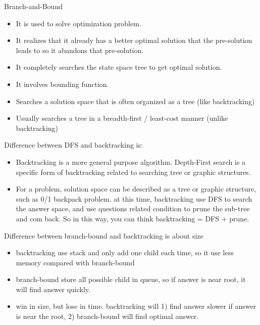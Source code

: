 \documentclass[a4paper,11pt,twoside]{book}
\begin{document}
	\par Branch-and-Bound
\begin{itemize}
\item It is used to solve optimization problem.

\item It realizes that it already has a better optimal solution that the pre-solution leads to so it abandons that pre-solution.

\item It completely searches the state space tree to get optimal solution.

\item It involves bounding function.

\item Searches a solution space that is often organized as a tree (like backtracking)

\item Usually searches a tree in a breadth-first / least-cost manner (unlike backtracking)

\end{itemize}

	\par Difference between DFS and backtracking is:
\begin{itemize}
\item Backtracking is a more general purpose algorithm. Depth-First search is a specific form of backtracking related to searching tree or graphic structures. 
 
\item For a problem, solution space can be described as a tree or graphic structure, such as 0/1 backpack problem. at this time, backtracking use DFS to search the answer space, and use questions related condition to prune the sub-tree and com back. So in this way, you can think backtracking = DFS + prune. 
\end{itemize}

\par Difference between branch-bound  and backtracking is about size

\begin{itemize}
\item backtracking use stack and only add one child each time, so it use less memory compared with branch-bound

\item branch-bound store all possible child in queue, so if answer is near root, it will find answer quickly. 

\item win in size, but lose in time. backtracking will 1) find answer slower if answer is near the root, 2) branch-bound will find optimal answer. 
\end{itemize}
\end{document}
